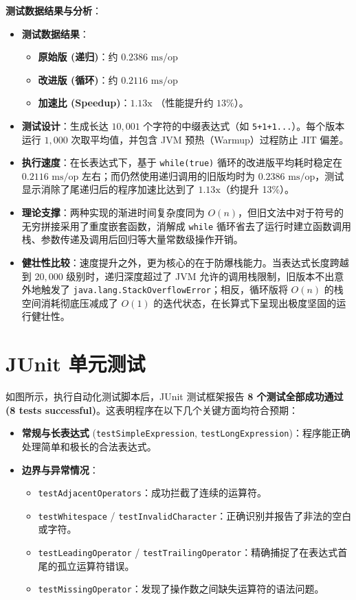 \textbf{测试数据结果与分析}：
\begin{itemize}
    \item \textbf{测试数据结果}：
      \begin{itemize}
        \item \textbf{原始版 (递归)}：约 $0.2386 \text{ ms/op}$
        \item \textbf{改进版 (循环)}：约 $0.2116 \text{ ms/op}$
        \item \textbf{加速比 (Speedup)}：\textbf{$1.13\text{x}$} （性能提升约 $13\%$）。
      \end{itemize}
    \item \textbf{测试设计}：生成长达 $10,001$ 个字符的中缀表达式（如 \texttt{5+1+1...}）。每个版本运行 $1,000$ 次取平均值，并包含 JVM 预热（Warmup）过程防止 JIT 偏差。
    \item \textbf{执行速度}：在长表达式下，基于 \texttt{while(true)} 循环的改进版平均耗时稳定在 $0.2116\text{ ms/op}$ 左右；而仍然使用递归调用的旧版均时为 $0.2386\text{ ms/op}$，测试显示消除了尾递归后的程序加速比达到了 \textbf{$1.13\text{x}$}（约提升 13\%）。  
    \item \textbf{理论支撑}：两种实现的渐进时间复杂度同为 $O(n)$，但旧文法中对于符号的无穷拼接采用了重度嵌套函数，消解成 \texttt{while} 循环省去了运行时建立函数调用栈、参数传递及调用后回归等大量常数级操作开销。
    \item \textbf{健壮性比较}：速度提升之外，更为核心的在于防爆栈能力。当表达式长度跨越到 $20,000$ 级别时，递归深度超过了 JVM 允许的调用栈限制，旧版本不出意外地触发了 \texttt{java.lang.StackOverflowError}；相反，循环版将 $O(n)$ 的栈空间消耗彻底压减成了 $O(1)$ 的迭代状态，在长算式下呈现出极度坚固的运行健壮性。
\end{itemize}

\section{JUnit 单元测试}

如图所示，执行自动化测试脚本后，JUnit 测试框架报告 \textbf{8 个测试全部成功通过 (8 tests successful)}。这表明程序在以下几个关键方面均符合预期：
\begin{itemize}
    \item \textbf{常规与长表达式} (\texttt{testSimpleExpression}, \texttt{testLongExpression})：程序能正确处理简单和极长的合法表达式。
    \item \textbf{边界与异常情况}：
    \begin{itemize}
        \item \texttt{testAdjacentOperators}：成功拦截了连续的运算符。
        \item \texttt{testWhitespace} / \texttt{testInvalidCharacter}：正确识别并报告了非法的空白或字符。
        \item \texttt{testLeadingOperator} / \texttt{testTrailingOperator}：精确捕捉了在表达式首尾的孤立运算符错误。
        \item \texttt{testMissingOperator}：发现了操作数之间缺失运算符的语法问题。
    \end{itemize}
\end{itemize}

